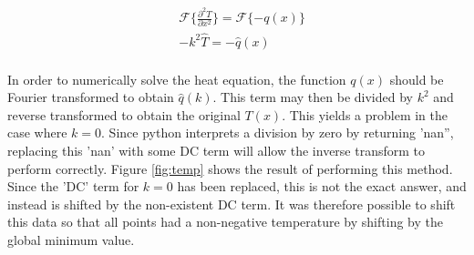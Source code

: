 \documentclass[twocolumn]{article}
\begin{document}
\begin{equation}
\begin{split}
&\mathcal{F}\{ \frac{\partial^2 T}{\partial x^2} \} = \mathcal{F} \{ -q(x) \} \\
&-k^2 \hat{T} = -\hat{q}(x) \\
%
\end{split}
\label{eq:gauss_transform}
\end{equation}

In order to numerically solve the heat equation, the function $q(x)$ should be Fourier transformed to obtain $\hat{q}(k)$. This term may then be divided by $k^2$ and reverse transformed to obtain the original $T(x)$. This yields a problem in the case where $k=0$. Since python interprets a division by zero by returning 'nan'', replacing this 'nan' with some DC term will allow the inverse transform to perform correctly. Figure \ref{fig:temp} shows the result of performing this method. Since the 'DC' term for $k=0$ has been replaced, this is not the exact answer, and instead is shifted by the non-existent DC term. It was therefore possible to shift this data so that all points had a non-negative temperature by shifting by the global minimum value. 
\end{document}
